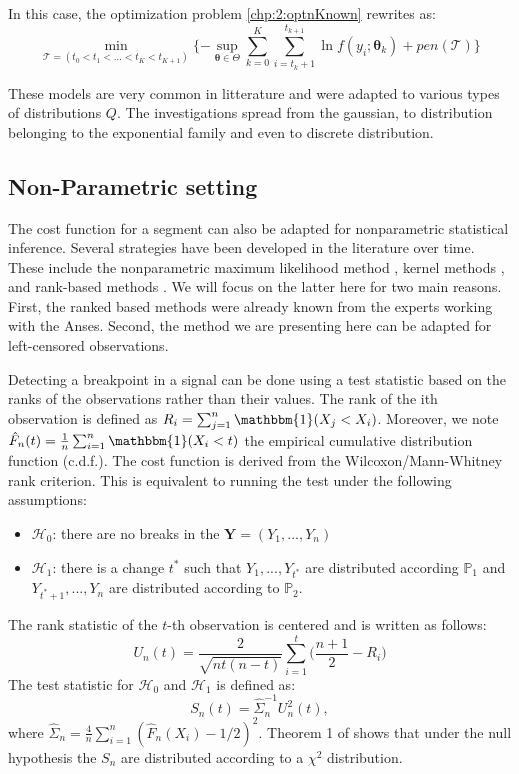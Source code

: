 In this case, the optimization problem \ref{chp:2:optnKnown} rewrites as: 
\begin{equation}\label{chp:2:penlik}
\min_{\mathcal{T} = (t_0 < t_1 < ... < t_K < t_{K+1})} \{ -\sup_{\bm \theta \in \Theta} \sum_{k=0}^K \sum_{i = t_k+1}^{t_{k+1}} \ln f(y_i; \bm \theta_k) + pen(\mathcal{T}) \} 
\end{equation}       

These models are very common in litterature and were adapted to various types of distributions $Q$. The investigations spread from the gaussian, to distribution belonging to the exponential family and even to discrete distribution. 

\subsection{Non-Parametric setting}

The cost function for a segment can also be adapted for nonparametric statistical inference. Several strategies have been developed in the literature over time. These include the nonparametric maximum likelihood method \cite{Zou2014,Einmahl2003}, kernel methods \cite{Harchaoui2008,li2015m}, and rank-based methods \cite{Pettitt1980,Wang2019}. We will focus on the latter here for two main reasons. First, the ranked based methods were already known from the experts working with the Anses. Second, the method we are presenting here can be adapted for left-censored observations.  

Detecting a breakpoint in a signal can be done using a test statistic based on the ranks of the observations rather than their values. The rank of the ith observation is defined as $R_i = \sum_{j =1}^n\mathbbm{1}(X_j < X_i)$. Moreover, we note $\hat{F}_n(t) = \frac{1}{n}\sum_{i = 1}^n\mathbbm{1}(X_i < t)$ the empirical cumulative distribution function (c.d.f.). The cost function is derived from the Wilcoxon/Mann-Whitney rank criterion. This is equivalent to running the test under the following assumptions: 
\begin{itemize}
  \item $\mathcal{H}_0$: there are no breaks in the $\bm Y = (Y_1,...,Y_n)$ 
  \item $\mathcal{H}_1$: there is a change $t^*$ such that $Y_1,...,Y_{t^*}$ are distributed according $\mathbb{P}_1$ and $Y_{t^*+1},...,Y_{n}$ are distributed according to $\mathbb{P}_2$. 
\end{itemize}
The rank statistic of the $t$-th observation is centered and is written as follows:
\begin{equation}\label{chp2:statranknp}
  U_n(t) = \frac{2}{\sqrt{nt(n-t)}}\sum_{i = 1}^{t}\bigg(\frac{n+1}{2} - R_i\bigg)
\end{equation}
The test statistic for $\mathcal{H}_0$ and $\mathcal{H}_1$ is defined as:
\begin{equation}\label{chp2:stattestnp}
  S_n(t) = \hat{\Sigma}_n^{-1} U^2_n(t),
\end{equation}
where $\hat{\Sigma}_n = \frac{4}{n}\sum_{i=1}^n(\hat{F}_n(X_i)-1/2)^2$. Theorem 1 of \cite{lung2015} shows that under the null hypothesis the $S_n$ are distributed according to a $\chi^2$ distribution.

